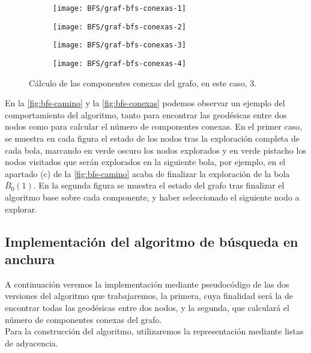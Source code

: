 \begin{figure}[!]
	\centering
	\begin{subfigure}{0.25\linewidth}
		\texttt{[image: BFS/graf-bfs-conexas-1]}
		\caption{}
	\end{subfigure}
	\begin{subfigure}{0.25\linewidth}
		\texttt{[image: BFS/graf-bfs-conexas-2]}
		\caption{}
	\end{subfigure}
	\begin{subfigure}{0.25\linewidth}
		\texttt{[image: BFS/graf-bfs-conexas-3]}
		\caption{}
	\end{subfigure}
	\begin{subfigure}{0.25\linewidth}
		\texttt{[image: BFS/graf-bfs-conexas-4]}
		\caption{}
	\end{subfigure}
	\caption{Cálculo de las componentes conexas del grafo, en este caso, 3.}
	\label{fig:bfs-conexas}
\end{figure}

En la \autoref{fig:bfs-camino} y la \autoref{fig:bfs-conexas} podemos observar un ejemplo del comportamiento del algoritmo, tanto para encontrar las geodésicas entre dos nodos como para calcular el número de componentes conexas. En el primer caso, se muestra en cada figura el estado de los nodos tras la exploración completa de cada bola, marcando en verde oscuro los nodos explorados y en verde pistacho los nodos visitados que serán explorados en la siguiente bola, por ejemplo, en el apartado (c) de la \autoref{fig:bfs-camino} acaba de finalizar la exploración de la bola $\overline B_0(1)$. En la segunda figura se muestra el estado del grafo tras finalizar el algoritmo base sobre cada componente, y haber seleccionado el siguiente nodo a explorar.


\subsection{Implementación del algoritmo de búsqueda en anchura}
A continuación veremos la implementación mediante pseudocódigo de las dos versiones del algoritmo que trabajaremos, la primera, cuya finalidad será la de encontrar todas las geodésicas entre dos nodos, y la segunda, que calculará el número de componentes conexas del grafo. \\

Para la construcción del algoritmo, utilizaremos la representación mediante listas de adyacencia. \\

